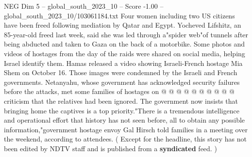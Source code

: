 \begin{textsample}{NEG Dim 5 – global\_south\_2023\_10 – Score -1.00 – global\_south\_2023\_10/103061184.txt}
Four women including two US citizens have been freed following mediation by Qatar and Egypt.
Yocheved Lifshitz, an 85-year-old freed last week, said she was led through a"spider web"of tunnels after being abducted and taken to Gaza on the back of a motorbike.
Some photos and videos of hostages from the day of the raids were shared on social media, helping Israel identify them.
Hamas released a video showing Israeli-French hostage Mia Shem on October 16.
Those images were condemned by the Israeli and French governments.
Netanyahu, whose government has acknowledged security failures before the attacks, met some families of hostages on @ @ @ @ @ @ @ @ @ @ criticism that the relatives had been ignored.
The government now insists that bringing home the captives is a top priority."There is a tremendous intelligence and operational effort that history has not seen before, all to obtain any possible information,"government hostage envoy Gal Hirsch told families in a meeting over the weekend, according to attendees. ( Except for the headline, this story has not been edited by NDTV staff and is published from a \textbf{syndicated} feed. )

\end{textsample}
